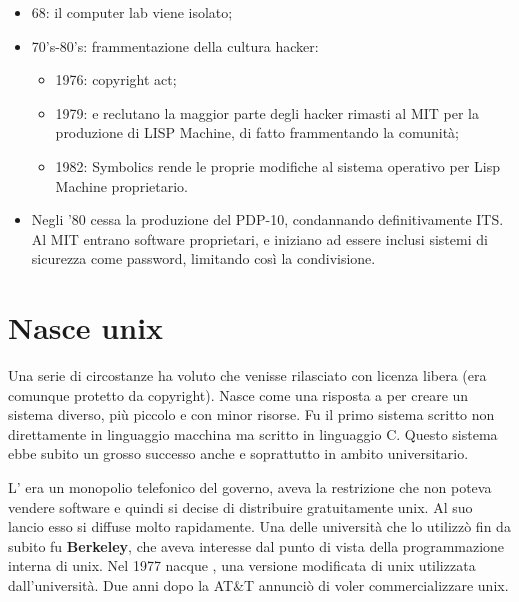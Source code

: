 \begin{itemize}

\item 68: il computer lab viene isolato;
\item 70's-80's: frammentazione della cultura hacker:

	\begin{itemize}

	\item 1976: copyright act;
	\item 1979:  e  reclutano la maggior parte degli hacker rimasti al MIT per la produzione di LISP Machine, di fatto frammentando la comunità;
	\item 1982: Symbolics rende le proprie modifiche al sistema operativo per Lisp Machine proprietario.
	
	\end{itemize}

\item Negli '80 cessa la produzione del PDP-10, condannando definitivamente ITS. Al MIT entrano software proprietari, e iniziano ad essere inclusi sistemi di sicurezza come password, limitando così la condivisione.

\end{itemize}

\section{Nasce unix}

Una serie di circostanze ha voluto che  venisse rilasciato con licenza libera (era comunque protetto da copyright). Nasce come una risposta a  per creare un sistema diverso, più piccolo e con minor risorse. Fu il primo sistema scritto non direttamente in linguaggio macchina ma scritto in linguaggio C. Questo sistema ebbe subito un grosso successo anche e soprattutto in ambito universitario. 

L' era un monopolio telefonico del governo, aveva la restrizione che non poteva vendere software e quindi si decise di distribuire gratuitamente unix. Al suo lancio esso si diffuse molto rapidamente. Una delle università che lo utilizzò fin da subito fu \textbf{Berkeley}, che aveva interesse dal punto di vista della programmazione interna di unix. Nel 1977 nacque , una versione modificata di unix utilizzata dall'università. Due anni dopo la AT\&T annunciò di voler commercializzare unix. 

